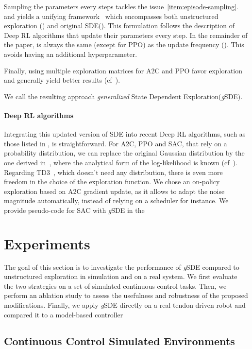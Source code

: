 \documentclass{article}
\newcommand{\sde}{State Dependent Exploration\xspace}
\newcommand{\SDE}{\textsc{SDE}\xspace}
\newcommand{\ourSDE}{\textit{g}\textsc{SDE}\xspace}
\newcommand{\aac}{\textsc{A2C}\xspace}
\newcommand{\ppo}{\textsc{PPO}\xspace}
\newcommand{\sac}{\textsc{SAC}\xspace}
\newcommand{\tddd}{\textsc{TD3}\xspace}
\begin{document}
Sampling the parameters  every  steps tackles the issue~\ref{item:episode-sampling}. and yields a unifying framework~\cite{hoof2017generalized} which encompasses both unstructured exploration () and original \SDE (). This formulation follows the description of Deep RL algorithms that update their parameters every  step.
In the remainder of the paper,  is always the same (except for \ppo) as the update frequency (). This avoids having an additional hyperparameter.

Finally, using multiple exploration matrices for \aac and \ppo favor exploration and generally yield better results (cf~).

We call the resulting approach \textit{generalized} \sde (\ourSDE).

\paragraph{Deep RL algorithms}
Integrating this updated version of \SDE into recent Deep RL algorithms, such as those listed in , is straightforward. For \aac, \ppo and \sac, that rely on a probability distribution, we can replace the original Gaussian distribution by the one derived in~, where the analytical form of the log-likelihood is known (cf~). Regarding \tddd~\citep{fujimoto2018addressing}, which doesn't need any distribution, there is even more freedom in the choice of the exploration function. We chose an on-policy exploration based on \aac gradient update, as it allows to adapt the noise magnitude automatically, instead of relying on a scheduler for instance.
We provide pseudo-code for \sac with \ourSDE in the~




\section{Experiments}
\label{sec:experiments}

The goal of this section is to investigate the performance of \ourSDE compared to unstructured exploration in simulation and on a real system.
We first evaluate the two strategies on a set of simulated continuous control tasks. Then, we perform an ablation study to assess the usefulness and robustness of the proposed modifications. Finally, we apply \ourSDE directly on a real tendon-driven robot and compared it to a model-based controller


\subsection{Continuous Control Simulated Environments}
\label{sec:pybullet-envs}
\end{document}
